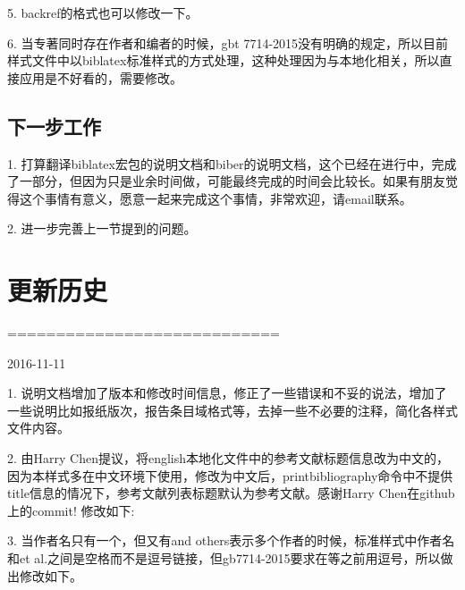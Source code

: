 \documentclass[11pt]{article} %
\begin{document}
5. backref的格式也可以修改一下。

6. 当专著同时存在作者和编者的时候，gbt 7714-2015没有明确的规定，所以目前样式文件中以biblatex标准样式的方式处理，这种处理因为与本地化相关，所以直接应用是不好看的，需要修改。

\subsection{下一步工作}

1. 打算翻译biblatex宏包的说明文档和biber的说明文档，这个已经在进行中，完成了一部分，但因为只是业余时间做，可能最终完成的时间会比较长。如果有朋友觉得这个事情有意义，愿意一起来完成这个事情，非常欢迎，请email联系。

2. 进一步完善上一节提到的问题。


\section{更新历史}
============================

2016-11-11

1. 说明文档增加了版本和修改时间信息，修正了一些错误和不妥的说法，增加了一些说明比如报纸版次，报告条目域格式等，去掉一些不必要的注释，简化各样式文件内容。

2. 由Harry Chen提议，将english本地化文件中的参考文献标题信息改为中文的，因为本样式多在中文环境下使用，修改为中文后，printbibliography命令中不提供title信息的情况下，参考文献列表标题默认为参考文献。感谢Harry Chen在github上的commit!
修改如下:
\begin{texlist}
\end{texlist}


3. 当作者名只有一个，但又有and others表示多个作者的时候，标准样式中作者名和et al.之间是空格而不是逗号链接，但gb7714-2015要求在等之前用逗号，所以做出修改如下。

\begin{texlist}
\end{texlist}
\end{document}
